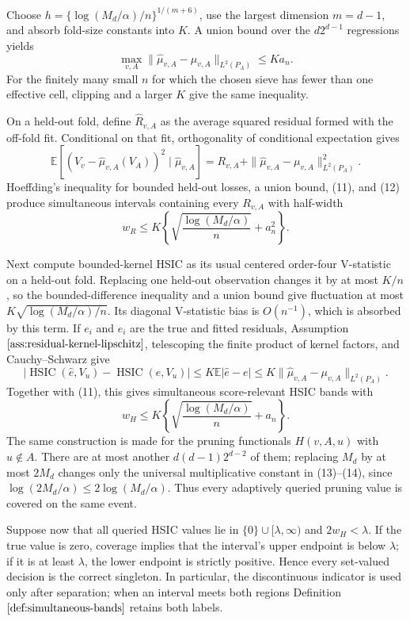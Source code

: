 Choose \(h=\{\log(M_d/\alpha)/n\}^{1/(m+6)}\), use the largest dimension \(m=d-1\), and absorb fold-size constants into \(K\).  A union bound over the \(d2^{d-1}\) regressions yields
\[
 \max_{v,A}\|\widehat\mu_{v,A}-\mu_{v,A}\|_{L^2(P_A)}
 \le K a_n. \tag{11}
\]
For the finitely many small \(n\) for which the chosen sieve has fewer than one effective cell, clipping and a larger \(K\) give the same inequality.

On a held-out fold, define \(\widehat R_{v,A}\) as the average squared residual formed with the off-fold fit.  Conditional on that fit, orthogonality of conditional expectation gives
\[
 \mathbb E[(V_v-\widehat\mu_{v,A}(V_A))^2\mid\widehat\mu_{v,A}]
 =R_{v,A}+\|\widehat\mu_{v,A}-\mu_{v,A}\|_{L^2(P_A)}^2. \tag{12}
\]
Hoeffding's inequality for bounded held-out losses, a union bound, (11), and (12) produce simultaneous intervals containing every \(R_{v,A}\) with half-width
\[
 w_R\le K\left\{\sqrt{\frac{\log(M_d/\alpha)}n}+a_n^2\right\}. \tag{13}
\]

Next compute bounded-kernel HSIC as its usual centered order-four V-statistic on a held-out fold.  Replacing one held-out observation changes it by at most \(K/n\), so the bounded-difference inequality and a union bound give fluctuation at most \(K\sqrt{\log(M_d/\alpha)/n}\).  Its diagonal V-statistic bias is \(O(n^{-1})\), which is absorbed by this term.  If \(e_i\) and \(\widehat e_i\) are the true and fitted residuals, Assumption \(\ref{ass:residual-kernel-lipschitz}\), telescoping the finite product of kernel factors, and Cauchy--Schwarz give
\[
 |\operatorname{HSIC}(\widehat e,V_u)-\operatorname{HSIC}(e,V_u)|
 \le K\mathbb E|\widehat e-e|
 \le K\|\widehat\mu_{v,A}-\mu_{v,A}\|_{L^2(P_A)}.
\]
Together with (11), this gives simultaneous score-relevant HSIC bands with
\[
 w_H\le K\left\{\sqrt{\frac{\log(M_d/\alpha)}n}+a_n\right\}. \tag{14}
\]
The same construction is made for the pruning functionals \(H(v,A,u)\) with \(u\notin A\).  There are at most another \(d(d-1)2^{d-2}\) of them; replacing \(M_d\) by at most \(2M_d\) changes only the universal multiplicative constant in (13)--(14), since \(\log(2M_d/\alpha)\le2\log(M_d/\alpha)\).  Thus every adaptively queried pruning value is covered on the same event.

Suppose now that all queried HSIC values lie in \(\{0\}\cup[\lambda,\infty)\) and \(2w_H<\lambda\).  If the true value is zero, coverage implies that the interval's upper endpoint is below \(\lambda\); if it is at least \(\lambda\), the lower endpoint is strictly positive.  Hence every set-valued decision is the correct singleton.  In particular, the discontinuous indicator is used only after separation; when an interval meets both regions Definition \(\ref{def:simultaneous-bands}\) retains both labels.

